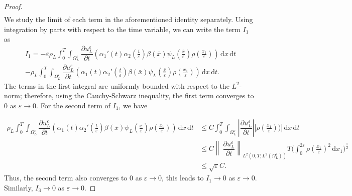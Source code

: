 \documentclass[11pt]{article}
\def\es{\varepsilon}
\def\oll{\Omega_L^\varepsilon}
\newcommand{\di}[1]{\,\mathrm{d}#1}
\begin{document}
\begin{proof}
\begin{multline}
\end{multline}
We study the limit of each term in the aforementioned identity separately.
Using integration by parts with respect to the time variable, we can write the term $ I_1$ as
\begin{multline*} 
    I_1=-\es \rho_L\int_0^T\int_{\oll}  \dfrac{\partial u_L^\es}{\partial t} (\alpha_1'(t)\alpha_2(\frac{t}{\es})\beta(\bar x) \psi_L(\frac{\bar x}{\es})\rho(\frac{x_1}{\es}))\di{x}\di{t}\\
    -\rho_L\int_0^T\int_{\oll}  \dfrac{\partial u_L^\es}{\partial t} (\alpha_1(t)\alpha_2'(\frac{t}{\es})\beta(\bar x) \psi_L(\frac{\bar x}{\es})\rho(\frac{x_1}{\es}))\di{x}\di{t}.
\end{multline*}
The terms in the first integral are uniformly bounded with respect to the $L^2$-norm; therefore, using the Cauchy-Schwarz inequality, the first term converges to $0$ as $\es\rightarrow0$. 
%
For the second term of $I_1$, we have 

\begin{align*}
    \rho_L\int_0^T\int_{\oll}  \dfrac{\partial u_L^\es}{\partial t} (\alpha_1(t)\alpha_2'(\frac{t}{\es})\beta(\bar x) \psi_L(\frac{\bar x}{\es})\rho(\frac{x_1}{\es}))\di{x}\di{t}&\leq C \int_0^T\int_{\oll} \left| \dfrac{\partial u_L^\es}{\partial t}\right| |\rho(\frac{x_1}{\es}))| \di{x}\di{t}\\
    &\leq C  \left\|\ \dfrac{\partial u_L^\es}{\partial t}\right\|_{L^{2}(0,T;L^2(\oll))}T\Big(\int_0^{2\es}\rho(\frac{x_1}{\es})^2\di{x_1}\Big)^{\frac{1}{2}}\\
    &\leq \sqrt{\es} C.
\end{align*}
Thus, the second term also converges to $0$ as $\es\rightarrow 0$, this leads to $I_1\rightarrow0 $ as $\es\rightarrow 0$. Similarly, $I_3\rightarrow0 $ as $\es\rightarrow 0$.


\end{proof}
\end{document}
